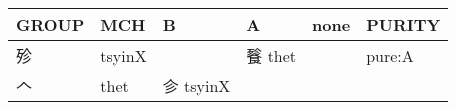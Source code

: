 \documentclass[14pt,a4paper]{scrartcl}
\begin{document}
\begin{longtable}[c]{@{}llllll@{}}
\toprule
\begin{minipage}[b]{0.14\columnwidth}\raggedright\strut
GROUP
\strut\end{minipage} &
\begin{minipage}[b]{0.14\columnwidth}\raggedright\strut
MCH
\strut\end{minipage} &
\begin{minipage}[b]{0.14\columnwidth}\raggedright\strut
B
\strut\end{minipage} &
\begin{minipage}[b]{0.14\columnwidth}\raggedright\strut
A
\strut\end{minipage} &
\begin{minipage}[b]{0.14\columnwidth}\raggedright\strut
none
\strut\end{minipage} &
\begin{minipage}[b]{0.14\columnwidth}\raggedright\strut
PURITY
\strut\end{minipage}\tabularnewline
\midrule
\endhead
\begin{minipage}[t]{0.14\columnwidth}\raggedright\strut
殄
\strut\end{minipage} &
\begin{minipage}[t]{0.14\columnwidth}\raggedright\strut
tsyinX
\strut\end{minipage} &
\begin{minipage}[t]{0.14\columnwidth}\raggedright\strut
\strut\end{minipage} &
\begin{minipage}[t]{0.14\columnwidth}\raggedright\strut
餮 thet
\strut\end{minipage} &
\begin{minipage}[t]{0.14\columnwidth}\raggedright\strut
\strut\end{minipage} &
\begin{minipage}[t]{0.14\columnwidth}\raggedright\strut
pure:A
\strut\end{minipage}\tabularnewline
\begin{minipage}[t]{0.14\columnwidth}\raggedright\strut
𠆢
\strut\end{minipage} &
\begin{minipage}[t]{0.14\columnwidth}\raggedright\strut
thet
\strut\end{minipage} &
\begin{minipage}[t]{0.14\columnwidth}\raggedright\strut
㐱 tsyinX
\strut\end{minipage} &
\begin{minipage}[t]{0.14\columnwidth}\raggedright\strut

\end{minipage}
\end{longtable}
\end{document}
